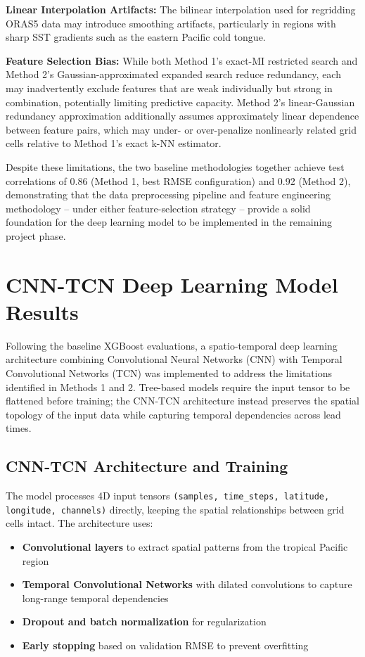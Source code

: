 \textbf{Linear Interpolation Artifacts:} The bilinear interpolation used for regridding ORAS5 data may introduce smoothing artifacts, particularly in regions with sharp SST gradients such as the eastern Pacific cold tongue.

\textbf{Feature Selection Bias:} While both Method 1's exact-MI restricted search and Method 2's Gaussian-approximated expanded search reduce redundancy, each may inadvertently exclude features that are weak individually but strong in combination, potentially limiting predictive capacity. Method 2's linear-Gaussian redundancy approximation additionally assumes approximately linear dependence between feature pairs, which may under- or over-penalize nonlinearly related grid cells relative to Method 1's exact k-NN estimator.

Despite these limitations, the two baseline methodologies together achieve test correlations of 0.86 (Method 1, best RMSE configuration) and 0.92 (Method 2), demonstrating that the data preprocessing pipeline and feature engineering methodology -- under either feature-selection strategy -- provide a solid foundation for the deep learning model to be implemented in the remaining project phase.


\section{CNN-TCN Deep Learning Model Results}
Following the baseline XGBoost evaluations, a spatio-temporal deep learning architecture combining Convolutional Neural Networks (CNN) with Temporal Convolutional Networks (TCN) was implemented to address the limitations identified in Methods 1 and 2. Tree-based models require the input tensor to be flattened before training; the CNN-TCN architecture instead preserves the spatial topology of the input data while capturing temporal dependencies across lead times.

\subsection{CNN-TCN Architecture and Training}
The model processes 4D input tensors \texttt{(samples, time\_steps, latitude, longitude, channels)} directly, keeping the spatial relationships between grid cells intact. The architecture uses:
\begin{itemize}
    \item \textbf{Convolutional layers} to extract spatial patterns from the tropical Pacific region
    \item \textbf{Temporal Convolutional Networks} with dilated convolutions to capture long-range temporal dependencies
    \item \textbf{Dropout and batch normalization} for regularization
    \item \textbf{Early stopping} based on validation RMSE to prevent overfitting
\end{itemize}

